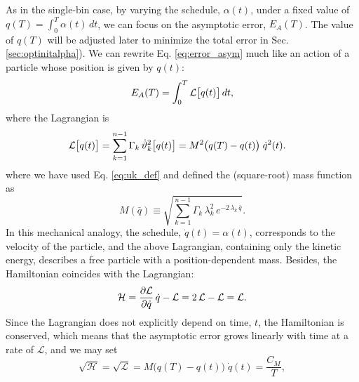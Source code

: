 \documentclass[reprint, superscriptaddress, floatfix]{revtex4-1}
\newcommand{\Err}{E}
\begin{document}
As in the single-bin case,
by varying the schedule, $\alpha(t)$, under a fixed value of
$q(T) = \int_0^T \alpha(t) \, dt$,
we can focus on the asymptotic error,
$\Err_A(T)$.
%
The value of $q(T)$ will be adjusted later
to minimize the total error in Sec. \ref{sec:optinitalpha}).
%
We can rewrite Eq. \eqref{eq:error_asym} much like an action
of a particle whose position is given by $q(t)$:
%
\begin{equation}
  \Err_A(T)
  =
  \int_0^T
    {\mathcal L} \bigl[ q(t)\bigr]
    \, dt
  ,
  \notag
\end{equation}
%
where the Lagrangian is
%
\begin{align}
  {\mathcal L} \bigl[ q(t) \bigr]
  &=
  \sum_{ k = 1 }^{n - 1}
    \Gamma_k \, {\dot \vartheta}_k^2\bigl[ q(t) \bigr]
  =
  M^2\bigl(q(T) - q(t) \bigr)
  \; \dot q^2( t )
  .
\notag
\end{align}
%
where we have
used Eq. \eqref{eq:uk_def} and
defined the (square-root) mass function as
%
\begin{equation}
  M(\bar q)
  \equiv
  \sqrt{
    \textstyle\sum_{ k = 1 }^{n - 1}
    \Gamma_k \, \lambda_k^2 \, e^{-2 \, \lambda_k \, \bar q}
  }
  .
  \label{eq:mass_func}
\end{equation}
%
In this mechanical analogy,
the schedule, $\dot q(t) = \alpha(t)$,
corresponds to the velocity of the particle,
%
and the above Lagrangian, containing only the kinetic energy,
describes a free particle
with a position-dependent mass.
%
Besides, the Hamiltonian
coincides with the Lagrangian:
%
\begin{equation}
  \mathcal H
  =
  \frac{ \partial \mathcal L }
       { \partial \dot q     }
  \, \dot q
  -
  \mathcal L
  =
  2 \, \mathcal L
  - \mathcal L
  =
  \mathcal L
  .
  \notag
\end{equation}
%
Since the Lagrangian
does not explicitly depend on time, $t$,
the Hamiltonian is conserved,\cite{}
which means that the asymptotic error grows
linearly with time at a rate of $\mathcal L$,
and we may set
%
\begin{equation}
  \sqrt{ \mathcal H }
  =
  \sqrt{ \mathcal L }
  =
  M\bigl( q(T) - q(t) \bigr)
  \;
  \dot q(t)
  =
  \frac{C_M}{T}
  ,
  \label{eq:Lagrangian_const}
\end{equation}
\end{document}
